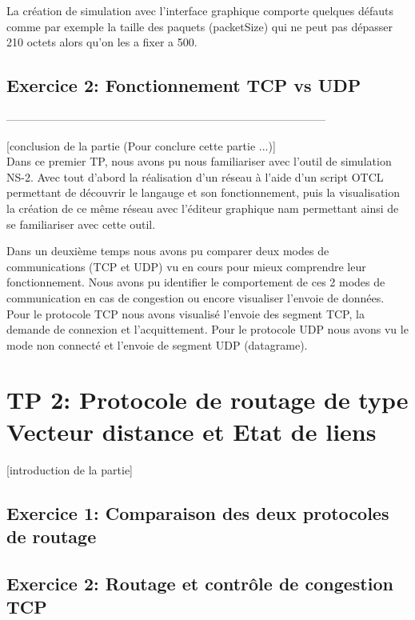 \documentclass[11pt]{article}
\begin{document}
La création de simulation avec l'interface graphique comporte quelques défauts comme par exemple la taille des paquets (packetSize) qui ne peut pas dépasser 210 octets alors qu'on les a fixer a 500.

\subsection{Exercice 2: Fonctionnement TCP vs UDP}






--------------------------------------------------------------------------------------

[conclusion de la partie (Pour conclure cette partie ...)] \\


Dans ce premier TP, nous avons pu nous familiariser avec l’outil de simulation NS-2. Avec tout d’abord la réalisation d'un réseau à l’aide d’un script OTCL permettant de découvrir le langauge et son fonctionnement, puis la visualisation la création de ce même réseau avec l'éditeur graphique nam permettant ainsi de se familiariser avec cette outil. 

Dans un deuxième temps nous avons pu comparer deux modes de communications (TCP et UDP) vu en cours pour mieux comprendre leur fonctionnement. Nous avons pu identifier le comportement de ces 2 modes de communication en cas de congestion ou encore visualiser l'envoie de données. Pour le protocole TCP nous avons visualisé l'envoie des segment TCP, la demande de connexion et l'acquittement. Pour le protocole UDP nous avons vu le mode non connecté et l'envoie de segment UDP (datagrame).

\pagebreak
\section{TP 2: Protocole de routage de type Vecteur distance et Etat de liens}
[introduction de la partie]

\subsection{Exercice 1: Comparaison des deux protocoles de routage}


\subsection{Exercice 2: Routage et contrôle de congestion TCP}
\end{document}
